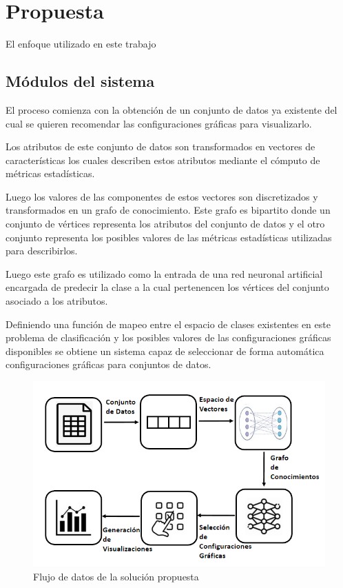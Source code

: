 \chapter{Propuesta}\label{chapter:proposal}

El enfoque utilizado en este trabajo 

\section{M\'odulos del sistema}

El proceso comienza con la obtenci\'on de un conjunto de datos
ya existente del cual se quieren recomendar las configuraciones
gr\'aficas para visualizarlo. 

Los atributos de este conjunto de datos son transformados en vectores de caracter\'isticas
los cuales describen estos atributos mediante el c\'omputo de
m\'etricas estad\'isticas.

Luego los valores de las componentes de estos vectores son
discretizados y transformados en un grafo de conocimiento. Este
grafo es bipartito donde un conjunto de v\'ertices representa
los atributos del conjunto de datos y el otro conjunto representa
los posibles valores de las m\'etricas estad\'isticas utilizadas para
describirlos.

Luego este grafo es utilizado como la entrada de una red neuronal
artificial encargada de predecir la clase a la cual pertenencen los
v\'ertices del conjunto asociado a los atributos.

Definiendo una funci\'on de mapeo entre el espacio de clases existentes en este problema 
de clasificaci\'on y los posibles valores de las configuraciones gr\'aficas
disponibles se obtiene un sistema capaz de seleccionar de forma autom\'atica
configuraciones gr\'aficas para conjuntos de datos.


\begin{figure}[h!]
    \includegraphics[width=\linewidth]{Graphics/simple_pipeline.png}
    \caption{Flujo de datos de la soluci\'on propuesta}
    \label{fig: flow_chart_sol}
\end{figure}


